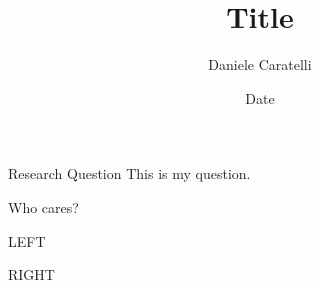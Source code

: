 \documentclass[12pt,aspectratio=169]{beamer}
\title{Title}
\date{Date}
\author{Daniele Caratelli}
\begin{document}
\maketitle

\begin{frame}{Research Question}
	This is my question.
\end{frame}


\begin{frame}{Who cares?}
	\begin{minipage}[t]{0.475\linewidth}
		LEFT
	\end{minipage}\pause
	\hfill%
	\begin{minipage}[t]{0.475\linewidth}
		RIGHT
	\end{minipage}
\end{frame}
\end{document}
